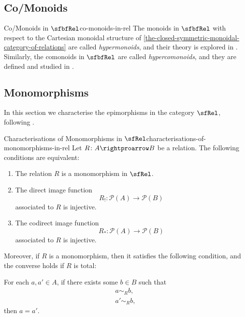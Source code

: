 \subsection{Co/Monoids}\label{subsection-co-monoids-in-rel}
\begin{remark}{Co/Monoids in $\sfbfRel$}{co-monoids-in-rel}%
    The monoids in $\sfbfRel$ with respect to the Cartesian monoidal structure of \cref{the-closed-symmetric-monoidal-category-of-relations} are called \emph{hypermonoids}, and their theory is explored in \ChapterHypermonoids. Similarly, the comonoids in $\sfbfRel$ are called \emph{hypercomonoids}, and they are defined and studied in \ChapterHypergroups.
\end{remark}
\subsection{Monomorphisms}\label{subsection-monomorphisms-in-rel}
In this section we characterise the epimorphisms in the category $\sfRel$, following .
\begin{proposition}{Characterisations of Monomorphisms in $\sfRel$}{characterisations-of-monomorphisms-in-rel}%
    Let $R\colon A\rightproarrow B$ be a relation. The following conditions are equivalent:
    \begin{enumerate}
        \item\label{characterisations-of-monomorphisms-in-rel-1}The relation $R$ is a monomorphism in $\sfRel$.
        \item\label{characterisations-of-monomorphisms-in-rel-2}The direct image function%
            \[
                R_{!}%
                \colon%
                \mathcal{P}(A)%
                \to%
                \mathcal{P}(B)%
            \]%
            associated to $R$ is injective.
        \item\label{characterisations-of-monomorphisms-in-rel-3}The codirect image function
            \[
                R_{*}%
                \colon%
                \mathcal{P}(A)%
                \to%
                \mathcal{P}(B)%
            \]%
            associated to $R$ is injective.
    \end{enumerate}
    Moreover, if $R$ is a monomorphism, then it satisfies the following condition, and the converse holds if $R$ is total:
    \begin{itemize}
        \itemstar For each $a,a'\in A$, if there exists some $b\in B$ such that
            \begin{align*}%
                a\sim_{R}b,\\%
                a'\sim_{R}b,%
            \end{align*}%
            then $a=a'$.
    \end{itemize}
\end{proposition}
